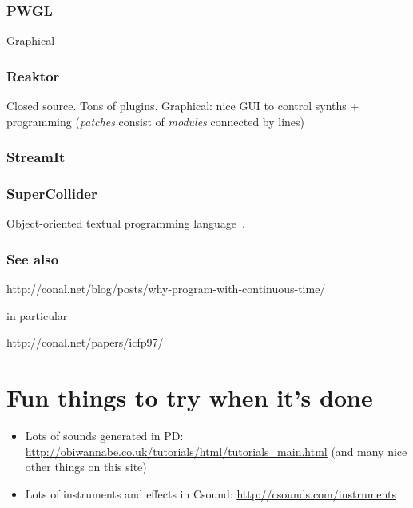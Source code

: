 \documentclass[a4paper,titlepage]{article}
\begin{document}
\subsubsection{PWGL}
\cite{pwgl}
Graphical

\subsubsection{Reaktor}
\cite{reaktor} Closed source. Tons of plugins. Graphical: nice GUI to control
synths + programming (\emph{patches} consist of \emph{modules} connected by
lines)

\subsubsection{StreamIt}
\cite{streamit}

\subsubsection{SuperCollider}
Object-oriented textual programming language~\cite{supercollider}.

\subsubsection{See also}
http://conal.net/blog/posts/why-program-with-continuous-time/

in particular

http://conal.net/papers/icfp97/

\section{Fun things to try when it's done}
\begin{itemize}
\item Lots of sounds generated in PD:
  \url{http://obiwannabe.co.uk/tutorials/html/tutorials_main.html}
  (and many nice other things on this site)
\item Lots of instruments and effects in Csound:
  \url{http://csounds.com/instruments}
\end{itemize}



\end{document}
